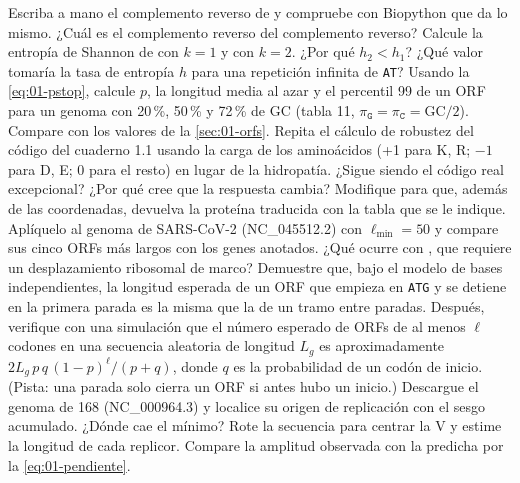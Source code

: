 \begin{ejercicios}
 Escriba a mano el complemento reverso de  y compruebe con Biopython que  da lo mismo. ¿Cuál es el complemento reverso del complemento reverso?
 Calcule la entropía de Shannon de  con $k=1$ y con $k=2$. ¿Por qué $h_2<h_1$? ¿Qué valor tomaría la tasa de entropía $h$ para una repetición infinita de \texttt{AT}?
 Usando la \cref{eq:01-pstop}, calcule $p$, la longitud media al azar y el percentil 99 de un ORF para un genoma con 20\,\%, 50\,\% y 72\,\% de GC (tabla 11, $\pi_\texttt{G}=\pi_\texttt{C}=\mathrm{GC}/2$). Compare con los valores de la \cref{sec:01-orfs}.
 Repita el cálculo de robustez del código del cuaderno 1.1 usando la carga de los aminoácidos (+1 para K, R; $-1$ para D, E; 0 para el resto) en lugar de la hidropatía. ¿Sigue siendo el código real excepcional? ¿Por qué cree que la respuesta cambia?
 Modifique  para que, además de las coordenadas, devuelva la proteína traducida con la tabla que se le indique. Aplíquelo al genoma de SARS-CoV-2 (NC\_045512.2) con $\ell_{\min}=50$ y compare sus cinco ORFs más largos con los genes anotados. ¿Qué ocurre con , que requiere un desplazamiento ribosomal de marco?
 Demuestre que, bajo el modelo de bases independientes, la longitud esperada de un ORF que empieza en \texttt{ATG} y se detiene en la primera parada es la misma que la de un tramo entre paradas. Después, verifique con una simulación que el número esperado de ORFs de al menos $\ell$ codones en una secuencia aleatoria de longitud $L_g$ es aproximadamente $2L_g\,p\,q\,(1-p)^{\ell}/(p+q)$, donde $q$ es la probabilidad de un codón de inicio. (Pista: una parada solo cierra un ORF si antes hubo un inicio.)
 Descargue el genoma de  168 (NC\_000964.3) y localice su origen de replicación con el sesgo acumulado. ¿Dónde cae el mínimo? Rote la secuencia para centrar la V y estime la longitud de cada replicor. Compare la amplitud observada con la predicha por la \cref{eq:01-pendiente}.
\end{ejercicios}

